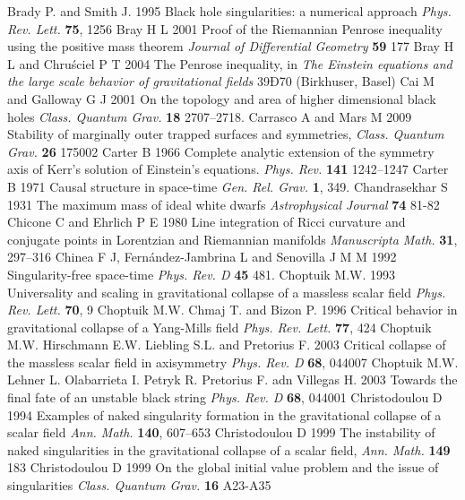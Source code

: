 \documentclass[12pt]{iopart}
\begin{document}
\begin{thebibliography}{999}
 Brady P. and Smith J. 1995 Black hole singularities: a numerical approach {\it Phys. Rev. Lett.} {\bf 75}, 1256
 Bray H L 2001 Proof of the Riemannian Penrose inequality using the positive mass theorem {\it Journal of Differential Geometry} {\bf 59} 177
 Bray H L and Chru\'{s}ciel P T 2004 The Penrose inequality, in {\it The Einstein equations and the large scale behavior of gravitational fields} 39Ð70 (Birkhuser, Basel)
 Cai M and Galloway G J 2001 On the topology and area of higher dimensional black holes {\it Class. Quantum Grav.} {\bf 18} 2707--2718.%
 Carrasco A and Mars M 2009 Stability of marginally outer trapped surfaces and symmetries, {\it Class. Quantum Grav.} {\bf 26} 175002 
 Carter B 1966 Complete analytic extension of the symmetry axis of Kerr's solution of Einstein's equations. {\it Phys. Rev.} {\bf 141} 1242--1247
 Carter B 1971 Causal structure in space-time {\it Gen. Rel. Grav.} {\bf 1}, 349.%
 Chandrasekhar S 1931 The maximum mass of ideal white dwarfs {\it Astrophysical Journal} {\bf 74} 81-82
 Chicone C and Ehrlich P E 1980 Line integration of Ricci curvature and conjugate points in Lorentzian and Riemannian manifolds {\it Manuscripta Math.} {\bf 31},
297--316
 Chinea F J, Fern\'andez-Jambrina L and Senovilla J M M
1992 Singularity-free space-time {\it Phys. Rev. D} {\bf 45} 481.
 Choptuik M.W. 1993 Universality and scaling in gravitational collapse of a massless scalar field {\it Phys. Rev. Lett.} {\bf 70}, 9
 Choptuik M.W. Chmaj T. and Bizon P. 1996 Critical behavior in gravitational collapse of a Yang-Mills field {\it Phys. Rev. Lett.} {\bf 77}, 424
 Choptuik M.W. Hirschmann E.W. Liebling S.L. and Pretorius F. 2003 Critical collapse of the massless scalar field in axisymmetry {\it Phys. Rev. D} {\bf 68}, 044007
 Choptuik M.W. Lehner L. Olabarrieta I. Petryk R. Pretorius F. adn Villegas H. 2003 Towards the final fate of an unstable black string {\it Phys. Rev. D} {\bf 68}, 044001
 Christodoulou D 1994 Examples of naked singularity formation in the gravitational collapse of a scalar field {\it Ann. Math.} {\bf 140}, 607--653
 Christodoulou D 1999 The instability of naked singularities in the gravitational collapse of a scalar field, {\it Ann. Math.} {\bf 149} 183
 Christodoulou D 1999 On the global initial value problem and the issue of singularities {\it Class. Quantum Grav.} {\bf 16} A23-A35

\end{thebibliography}
\end{document}
